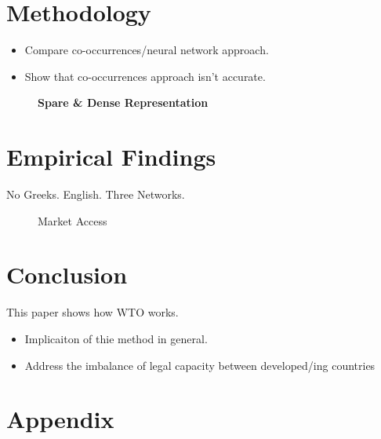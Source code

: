 \documentclass[12pt,letterpaper]{article}
\begin{document}
\section{Methodology}

\begin{itemize}
  \item Compare co-occurrences/neural network approach.

  \item Show that co-occurrences approach isn't accurate.
\end{itemize}

\begin{figure}[!tbp]
  \begin{subfigure}[b]{0.49\textwidth}
  \end{subfigure}
  \hfill
  \begin{subfigure}[b]{0.49\textwidth}
  \end{subfigure}
  \caption{{\bf Spare \& Dense Representation}}
  \label{sparse_dense}
\end{figure}


\section{Empirical Findings}
No Greeks. English. Three Networks.

\begin{figure}
  \centering{
    
  }
  \caption{Market Access}
  \label{fig:market-aceess}
\end{figure}




\section{Conclusion}
This paper shows how WTO works.

\begin{itemize}
  \item Implicaiton of thie method in general.
  \item Address the imbalance of legal capacity between developed/ing countries
\end{itemize}

\clearpage



\section{Appendix}




\end{document}
